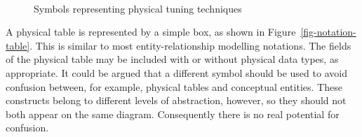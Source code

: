 \documentclass{CRPITStyle}
\begin{document}
\begin{figure}[htb]
{{		\hfill%
		\mbox{} \\%
		\mbox{}%
		\hfill%
		\hfill%
		\hfill%
		\hfill%
		\mbox{}%
		\vskip 0.5cm%
	}}
	\caption{Symbols representing physical tuning techniques}
	\label{fig-notation}
\end{figure}

A physical table is represented by a simple box, as shown in
Figure~\ref{fig-notation-table}. This is similar to most
entity-relationship modelling notations. The fields of the physical
table may be included with or without physical data types, as
appropriate. It could be argued that a different symbol should be used
to avoid confusion between, for example, physical tables and conceptual
entities. These constructs belong to different levels of abstraction,
however, so they should not both appear on the same diagram.
Consequently there is no real potential for confusion.
\end{document}
